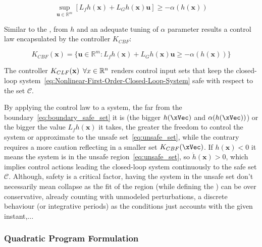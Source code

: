 \begin{equation}
 \sup_{\mathbf{u} \in \mathbb{R}^m} [L_fh(\mathbf{x}) + L_Gh(\mathbf{x})\mathbf{u}] \geq -\alpha(h( \mathbf{x} ))
 \label{eq:CBF}
\end{equation}

Similar to the , from  \(h\) and an adequate tuning of \( \alpha \) parameter results a control law encapsulated by the controller \(K_{CBF}\):

\begin{equation}
 K_{CBF}(\mathbf{x}) = \{ \mathbf{u} \in \mathbb{R}^m: L_fh(\mathbf{x}) + L_Gh(\mathbf{x})\mathbf{u} \geq -\alpha(h( \mathbf{x} )) \}
 \label{eq:K-CBF}
\end{equation}


The controller \(K_{CLF}(\mathbf{x}) \hspace{0.5em} \forall x \in \mathbb{R}^n \) renders control input sets that keep the closed-loop system~\ref{eq:Nonlinear-First-Order-Closed-Loop-System} safe with respect to the set \(\mathcal{C}\). \par

By applying the control law to a system, the far from the boundary~\ref{eq:boundary_safe_set} it is (the bigger \(h(\xVec)\) and \(\alpha(h(\xVec))\)) or the bigger the value \(L_fh( \mathbf{x} )\) it takes, the greater the freedom to control the system or approximate to the unsafe set~\ref{eq:unsafe_set}, while the contrary requires a more caution reflecting in a smaller set \(K_{CBF}(\xVec)\). If \(h( \mathbf{x} ) < 0\) it means the system is in the unsafe region~\ref{eq:unsafe_set}, so \(\dot{h}( \mathbf{x}) > 0\), which implies control actions leading the closed-loop system continuously to the safe set \(\mathcal{C}\). Although, safety is a critical factor, having the system in the unsafe set don't necessarily mean collapse as the fit of the region (while defining the ) can be over conservative, already counting with unmodeled perturbations, a discrete behaviour (or integrative periods) as the  conditions just accounts with the given instant,... \\ 





\subsubsection{Quadratic Program Formulation}
\label{subsub:quadratic_program_formulation}

